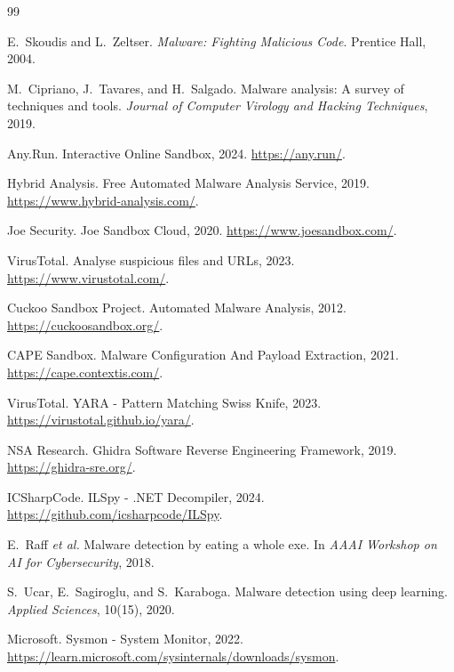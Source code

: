\begin{thebibliography}{99}

E.~Skoudis and L.~Zeltser.
\newblock \emph{Malware: Fighting Malicious Code}.
\newblock Prentice Hall, 2004.

M.~Cipriano, J.~Tavares, and H.~Salgado.
\newblock Malware analysis: A survey of techniques and tools.
\newblock \emph{Journal of Computer Virology and Hacking Techniques}, 2019.

Any.Run.
\newblock Interactive Online Sandbox, 2024.
\newblock \url{https://any.run/}.

Hybrid Analysis.
\newblock Free Automated Malware Analysis Service, 2019.
\newblock \url{https://www.hybrid-analysis.com/}.

Joe Security.
\newblock Joe Sandbox Cloud, 2020.
\newblock \url{https://www.joesandbox.com/}.

VirusTotal.
\newblock Analyse suspicious files and URLs, 2023.
\newblock \url{https://www.virustotal.com/}.

Cuckoo Sandbox Project.
\newblock Automated Malware Analysis, 2012.
\newblock \url{https://cuckoosandbox.org/}.

CAPE Sandbox.
\newblock Malware Configuration And Payload Extraction, 2021.
\newblock \url{https://cape.contextis.com/}.

VirusTotal.
\newblock YARA - Pattern Matching Swiss Knife, 2023.
\newblock \url{https://virustotal.github.io/yara/}.

NSA Research.
\newblock Ghidra Software Reverse Engineering Framework, 2019.
\newblock \url{https://ghidra-sre.org/}.

ICSharpCode.
\newblock ILSpy - .NET Decompiler, 2024.
\newblock \url{https://github.com/icsharpcode/ILSpy}.

E.~Raff \emph{et al.}
\newblock Malware detection by eating a whole exe.
\newblock In \emph{AAAI Workshop on AI for Cybersecurity}, 2018.

S.~Ucar, E.~Sagiroglu, and S.~Karaboga.
\newblock Malware detection using deep learning.
\newblock \emph{Applied Sciences}, 10(15), 2020.

Microsoft.
\newblock Sysmon - System Monitor, 2022.
\newblock \url{https://learn.microsoft.com/sysinternals/downloads/sysmon}.


\end{thebibliography}
